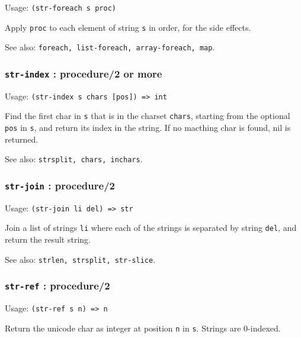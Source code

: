 \documentclass[
]{article}
\newcommand{\passthrough}[1]{#1}
\begin{document}
Usage: \passthrough{\lstinline!(str-foreach s proc)!}

Apply \passthrough{\lstinline!proc!} to each element of string
\passthrough{\lstinline!s!} in order, for the side effects.

See also:
\passthrough{\lstinline!foreach, list-foreach, array-foreach, map!}.

\hypertarget{str-index-procedure2-or-more}{%
\subsubsection{\texorpdfstring{\texttt{str-index} : procedure/2 or
more}{str-index : procedure/2 or more}}\label{str-index-procedure2-or-more}}

Usage: \passthrough{\lstinline!(str-index s chars [pos]) => int!}

Find the first char in \passthrough{\lstinline!s!} that is in the
charset \passthrough{\lstinline!chars!}, starting from the optional
\passthrough{\lstinline!pos!} in \passthrough{\lstinline!s!}, and return
its index in the string. If no macthing char is found, nil is returned.

See also: \passthrough{\lstinline!strsplit, chars, inchars!}.

\hypertarget{str-join-procedure2}{%
\subsubsection{\texorpdfstring{\texttt{str-join} :
procedure/2}{str-join : procedure/2}}\label{str-join-procedure2}}

Usage: \passthrough{\lstinline!(str-join li del) => str!}

Join a list of strings \passthrough{\lstinline!li!} where each of the
strings is separated by string \passthrough{\lstinline!del!}, and return
the result string.

See also: \passthrough{\lstinline!strlen, strsplit, str-slice!}.

\hypertarget{str-ref-procedure2}{%
\subsubsection{\texorpdfstring{\texttt{str-ref} :
procedure/2}{str-ref : procedure/2}}\label{str-ref-procedure2}}

Usage: \passthrough{\lstinline!(str-ref s n) => n!}

Return the unicode char as integer at position
\passthrough{\lstinline!n!} in \passthrough{\lstinline!s!}. Strings are
0-indexed.
\end{document}
